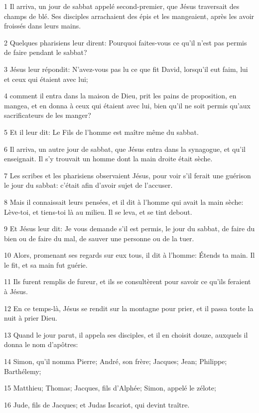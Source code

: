 \par 1 Il arriva, un jour de sabbat appelé second-premier, que Jésus traversait des champs de blé. Ses disciples arrachaient des épis et les mangeaient, après les avoir froissés dans leurs mains.
\par 2 Quelques pharisiens leur dirent: Pourquoi faites-vous ce qu'il n'est pas permis de faire pendant le sabbat?
\par 3 Jésus leur répondit: N'avez-vous pas lu ce que fit David, lorsqu'il eut faim, lui et ceux qui étaient avec lui;
\par 4 comment il entra dans la maison de Dieu, prit les pains de proposition, en mangea, et en donna à ceux qui étaient avec lui, bien qu'il ne soit permis qu'aux sacrificateurs de les manger?
\par 5 Et il leur dit: Le Fils de l'homme est maître même du sabbat.
\par 6 Il arriva, un autre jour de sabbat, que Jésus entra dans la synagogue, et qu'il enseignait. Il s'y trouvait un homme dont la main droite était sèche.
\par 7 Les scribes et les pharisiens observaient Jésus, pour voir s'il ferait une guérison le jour du sabbat: c'était afin d'avoir sujet de l'accuser.
\par 8 Mais il connaissait leurs pensées, et il dit à l'homme qui avait la main sèche: Lève-toi, et tiens-toi là au milieu. Il se leva, et se tint debout.
\par 9 Et Jésus leur dit: Je vous demande s'il est permis, le jour du sabbat, de faire du bien ou de faire du mal, de sauver une personne ou de la tuer.
\par 10 Alors, promenant ses regards sur eux tous, il dit à l'homme: Étends ta main. Il le fit, et sa main fut guérie.
\par 11 Ils furent remplis de fureur, et ils se consultèrent pour savoir ce qu'ils feraient à Jésus.
\par 12 En ce temps-là, Jésus se rendit sur la montagne pour prier, et il passa toute la nuit à prier Dieu.
\par 13 Quand le jour parut, il appela ses disciples, et il en choisit douze, auxquels il donna le nom d'apôtres:
\par 14 Simon, qu'il nomma Pierre; André, son frère; Jacques; Jean; Philippe; Barthélemy;
\par 15 Matthieu; Thomas; Jacques, fils d'Alphée; Simon, appelé le zélote;
\par 16 Jude, fils de Jacques; et Judas Iscariot, qui devint traître.
